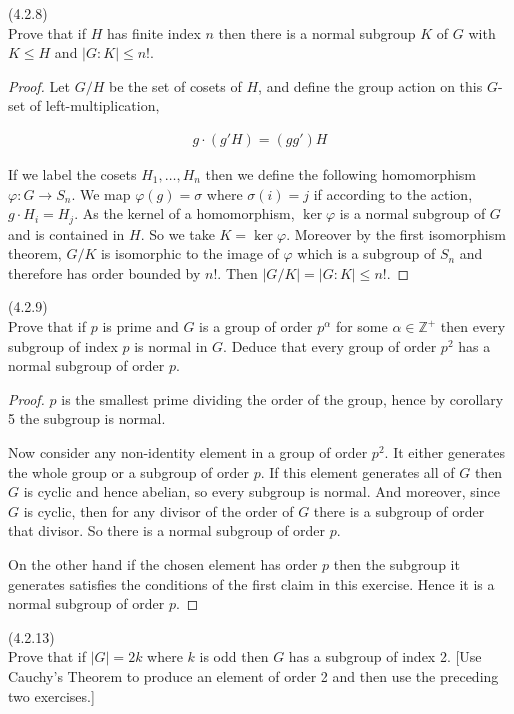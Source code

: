 \documentclass{exam}
\begin{document}
\begin{questions}
\question(4.2.8)\\
Prove that if $H$ has finite index $n$ then there is a normal subgroup $K$ of $G$ with $K\leq H$ and $|G:K|\leq n!$.

\begin{proof}
  Let $G/H$ be the set of cosets of $H$, and define the group action on this $G$-set of left-multiplication,

  \begin{align*}
    g\cdot (g'H) = (gg')H
  \end{align*}

  If we label the cosets $H_1, \dots, H_n$ then we define the following homomorphism $\varphi: G\rightarrow S_n$. We map $\varphi(g) = \sigma$ where $\sigma(i)=j$ if according to the action, $g\cdot H_i = H_j$.  As the kernel of a homomorphism, $\ker\varphi$ is a normal subgroup of $G$ and is contained in $H$.  So we take $K=\ker\varphi$.  Moreover by the first isomorphism theorem, $G/K$ is isomorphic to the image of $\varphi$ which is a subgroup of $S_n$ and therefore has order bounded by $n!$.  Then $|G/K|=|G:K|\leq n!$.

\end{proof}

\question(4.2.9)\\
Prove that if $p$ is prime and $G$ is a group of order $p^\alpha$ for some $\alpha\in\mathbb Z^+$ then every subgroup of index $p$ is normal in $G$.  Deduce that every group of order $p^2$ has a normal subgroup of order $p$.

\begin{proof}
  $p$ is the smallest prime dividing the order of the group, hence by corollary 5 the subgroup is normal.

  Now consider any non-identity element in a group of order $p^2$.  It either generates the whole group or a subgroup of order $p$.  If this element generates all of $G$ then $G$ is cyclic and hence abelian, so every subgroup is normal.  And moreover, since $G$ is cyclic, then for any divisor of the order of $G$ there is a subgroup of order that divisor.  So there is a normal subgroup of order $p$.

  On the other hand if the chosen element has order $p$ then the subgroup it generates satisfies the conditions of the first claim in this exercise.  Hence it is a normal subgroup of order $p$.
\end{proof}

\question(4.2.13)\\
Prove that if $|G|=2k$ where $k$ is odd then $G$ has a subgroup of index 2.  [Use Cauchy's Theorem to produce an element of order 2 and then use the preceding two exercises.]


\end{questions}
\end{document}
